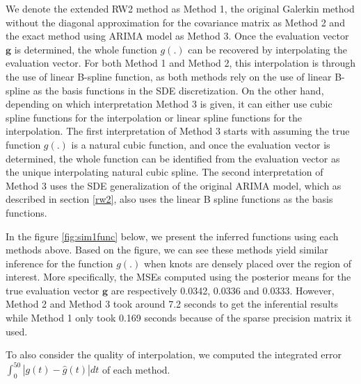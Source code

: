 \documentclass{article}
\begin{document}
We denote the extended RW2 method as Method 1, the original Galerkin method without the diagonal approximation for the covariance matrix as Method 2 and the exact method using ARIMA model as Method 3. Once the evaluation vector $\boldsymbol{g}$ is determined, the whole function $g(.)$ can be recovered by interpolating the evaluation vector. For both Method 1 and Method 2, this interpolation is through the use of linear B-spline function, as both methods rely on the use of linear B-spline as the basis functions in the SDE discretization. On the other hand, depending on which interpretation Method 3 is given, it can either use cubic spline functions for the interpolation or linear spline functions for the interpolation. The first interpretation of Method 3 starts with assuming the true function $g(.)$ is a natural cubic function, and once the evaluation vector is determined, the whole function can be identified from the evaluation vector as the unique interpolating natural cubic spline. The second interpretation of Method 3 uses the SDE generalization of the original ARIMA model, which as described in section \ref{rw2}, also uses the linear B spline functions as the basis functions.

In the figure \ref{fig:sim1func} below, we present the inferred functions using each methods above. Based on the figure, we can see these methods yield similar inference for the function $g(.)$ when knots are densely placed over the region of interest. More specifically, the MSEs computed using the posterior means for the true evaluation vector $\boldsymbol{g}$ are respectively 0.0342, 0.0336 and 0.0333. However, Method 2 and Method 3 took around 7.2 seconds to get the inferential results while Method 1 only took 0.169 seconds because of the sparse precision matrix it used. 

To also consider the quality of interpolation, we computed the integrated error $\int_0^{50} |g(t) - \hat{g}(t)| dt$ of each method. 
\end{document}
